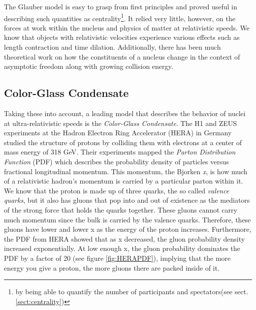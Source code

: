 The Glauber model is easy to grasp from first principles and proved useful in describing such quantities as centrality\footnote{by being able to quantify the number of participants and spectators(see sect. \ref{sect:centrality})}. It relied very little, however, on the forces at work within the nucleus and physics of matter at relativistic speeds. We know that objects with relativistic velocities experience various effects such as length contraction and time dilation. Additionally, there has been much theoretical work on how the constituents of a nucleus change in the context of asymptotic freedom along with growing collision energy\citep{PhysRevD.10.1649}.

\subsection{Color-Glass Condensate}
Taking these into account, a leading model that describes the behavior of nuclei at ultra-relativistic speeds is the \textit{Color-Glass Condensate}. The H1 and ZEUS experiments at the Hadron Electron Ring Accelerator (HERA) in Germany studied the structure of protons by colliding them with electrons at a center of mass energy of 318 GeV\citep{Abramowicz2015}. Their experiments mapped the \textit{Parton Distribution Function} (PDF) which describes the probability density of particles versus fractional longitudinal momentum. This momentum, the Bjorken \textit{x}, is how much of a relativistic hadron's momentum is carried by a particular parton within it. We know that the proton is made up of three quarks, the so called \textit{valence quarks}, but it also has gluons that pop into and out of existence as the mediators of the strong force that holds the quarks together. These gluons cannot carry much momentum since the bulk is carried by the valence quarks. Therefore, these gluons have lower and lower x as the energy of the proton increases. Furthermore, the PDF from HERA showed that as x decreased, the gluon probability density increased exponentially. At low enough x, the gluon probability dominates the PDF by a factor of 20 (see figure \ref{fig:HERAPDF}), implying that the more energy you give a proton, the more gluons there are packed inside of it.

